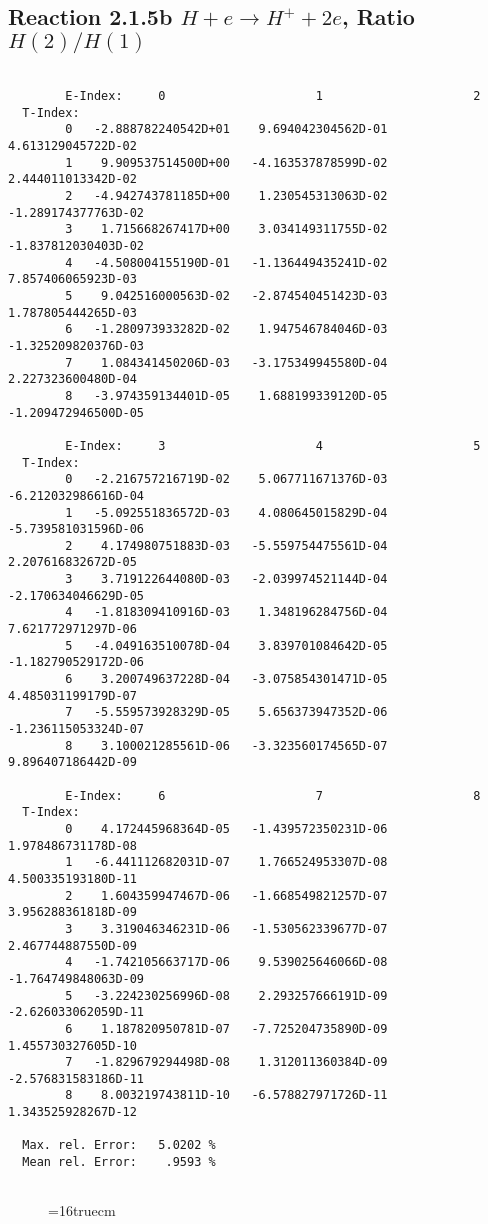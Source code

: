 \documentclass[12pt,dvipdfmx]{article}
\begin{document}
\newpage
\subsection{
Reaction 2.1.5b  $H + e \rightarrow H^+ + 2e$, Ratio $H(2)/H(1)$
}


\begin{small}\begin{verbatim}

        E-Index:     0                     1                     2
  T-Index:
        0   -2.888782240542D+01    9.694042304562D-01    4.613129045722D-02
        1    9.909537514500D+00   -4.163537878599D-02    2.444011013342D-02
        2   -4.942743781185D+00    1.230545313063D-02   -1.289174377763D-02
        3    1.715668267417D+00    3.034149311755D-02   -1.837812030403D-02
        4   -4.508004155190D-01   -1.136449435241D-02    7.857406065923D-03
        5    9.042516000563D-02   -2.874540451423D-03    1.787805444265D-03
        6   -1.280973933282D-02    1.947546784046D-03   -1.325209820376D-03
        7    1.084341450206D-03   -3.175349945580D-04    2.227323600480D-04
        8   -3.974359134401D-05    1.688199339120D-05   -1.209472946500D-05

        E-Index:     3                     4                     5
  T-Index:
        0   -2.216757216719D-02    5.067711671376D-03   -6.212032986616D-04
        1   -5.092551836572D-03    4.080645015829D-04   -5.739581031596D-06
        2    4.174980751883D-03   -5.559754475561D-04    2.207616832672D-05
        3    3.719122644080D-03   -2.039974521144D-04   -2.170634046629D-05
        4   -1.818309410916D-03    1.348196284756D-04    7.621772971297D-06
        5   -4.049163510078D-04    3.839701084642D-05   -1.182790529172D-06
        6    3.200749637228D-04   -3.075854301471D-05    4.485031199179D-07
        7   -5.559573928329D-05    5.656373947352D-06   -1.236115053324D-07
        8    3.100021285561D-06   -3.323560174565D-07    9.896407186442D-09

        E-Index:     6                     7                     8
  T-Index:
        0    4.172445968364D-05   -1.439572350231D-06    1.978486731178D-08
        1   -6.441112682031D-07    1.766524953307D-08    4.500335193180D-11
        2    1.604359947467D-06   -1.668549821257D-07    3.956288361818D-09
        3    3.319046346231D-06   -1.530562339677D-07    2.467744887550D-09
        4   -1.742105663717D-06    9.539025646066D-08   -1.764749848063D-09
        5   -3.224230256996D-08    2.293257666191D-09   -2.626033062059D-11
        6    1.187820950781D-07   -7.725204735890D-09    1.455730327605D-10
        7   -1.829679294498D-08    1.312011360384D-09   -2.576831583186D-11
        8    8.003219743811D-10   -6.578827971726D-11    1.343525928267D-12

  Max. rel. Error:   5.0202 %
  Mean rel. Error:    .9593 %


\end{verbatim}\end{small}
\begin{figure} \label{2.1.5b}
\epsfxsize=16truecm
\end{figure}
\end{document}
